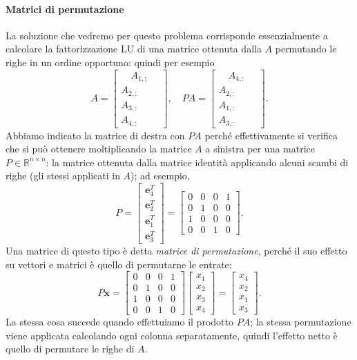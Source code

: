 \documentclass[a4paper]{report}
\theoremstyle{definiton}
\theoremstyle{remark}
\newcommand{\x}{\mathbf{x}}
\begin{document}
\paragraph{Matrici di permutazione}
La soluzione che vedremo per questo problema corrisponde essenzialmente a calcolare la fattorizzazione LU di una matrice ottenuta dalla $A$ permutando le righe in un ordine opportuno: quindi per esempio
\[
A = \begin{bmatrix}
    \hspace{1em} A_{1,:} \hspace{1em}  \\
    A_{2,:} \\
    A_{3,:} \\
    A_{4,:}
\end{bmatrix}, \quad
PA = \begin{bmatrix}
    \hspace{1em} A_{4,:} \hspace{1em}\\
    A_{2,:}\\
    A_{1,:}\\
    A_{3,:}
\end{bmatrix}.
\]
Abbiamo indicato la matrice di destra con $PA$ perché effettivamente si verifica che si può ottenere moltiplicando la matrice $A$ a sinistra per una matrice $P\in\mathbb{R}^{n\times n}$: la matrice ottenuta dalla matrice identità applicando alcuni scambi di righe (gli stessi applicati in $A$); ad esempio,
\[
P = 
\begin{bmatrix}
    \mathbf{e}_4^T\\
    \mathbf{e}_2^T\\
    \mathbf{e}_1^T\\
    \mathbf{e}_3^T
\end{bmatrix}
=
\begin{bmatrix}
    0 & 0 & 0 & 1\\
    0 & 1 & 0 & 0\\
    1 & 0 & 0 & 0\\
    0 & 0 & 1 & 0
\end{bmatrix}.
\]
Una matrice di questo tipo è detta \emph{matrice di permutazione}, perché il suo effetto su vettori e matrici è quello di permutarne le entrate:
\[
P\mathbf{x}
=
\begin{bmatrix}
    0 & 0 & 0 & 1\\
    0 & 1 & 0 & 0\\
    1 & 0 & 0 & 0\\
    0 & 0 & 1 & 0
\end{bmatrix}
\begin{bmatrix}
    x_1\\x_2\\x_3\\x_4
\end{bmatrix} = \begin{bmatrix}
    x_4\\x_2\\x_1\\x_3
\end{bmatrix}.
\]
La stessa cosa succede quando effettuiamo il prodotto $PA$; la stessa permutazione viene applicata calcolando ogni colonna separatamente, quindi l'effetto netto è quello di permutare le righe di $A$.
\end{document}

